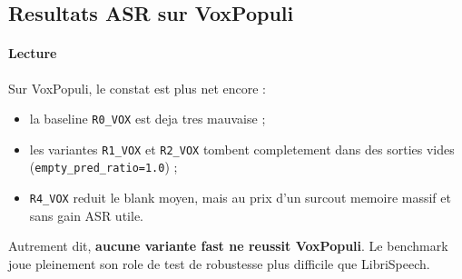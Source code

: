 \documentclass[11pt,a4paper]{article}
\begin{document}
\subsection{Resultats ASR sur VoxPopuli}
\begin{table}[H]
\centering
\caption{Resultats VoxPopuli, meilleur checkpoint, seeds 42/123/456/789/1024}
\label{tab:vox-results}
\end{table}

\paragraph{Lecture}
Sur VoxPopuli, le constat est plus net encore :
\begin{itemize}[leftmargin=1.2cm]
\item la baseline \texttt{R0\_VOX} est deja tres mauvaise ;
\item les variantes \texttt{R1\_VOX} et \texttt{R2\_VOX} tombent completement dans des sorties vides (\texttt{empty\_pred\_ratio=1.0}) ;
\item \texttt{R4\_VOX} reduit le blank moyen, mais au prix d'un surcout memoire massif et sans gain ASR utile.
\end{itemize}

Autrement dit, \textbf{aucune variante fast ne reussit VoxPopuli}. Le benchmark joue pleinement son role de test de robustesse plus difficile que LibriSpeech.
\end{document}
